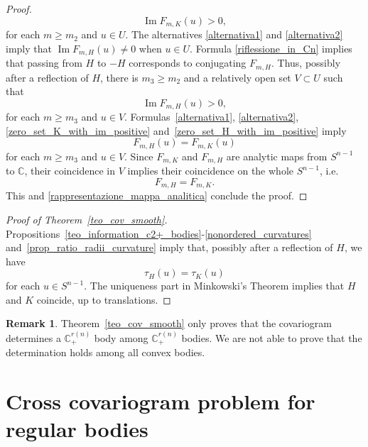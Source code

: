 \documentclass[a4paper]{amsart}
\theoremstyle{definition}
\newtheorem{remark}[theorem]{Remark}
\numberwithin{equation}{section}
\begin{document}
\begin{proof}
\begin{equation}\label{zero_set_K_with_im_positive}
{\operatorname{Im}} F_{m,K}(u)>0,
\end{equation}
for each $m\ge m_2$ and $u\in U$. The alternatives  \eqref{alternativa1} and \eqref{alternativa2} imply that ${\operatorname{Im}} F_{m,H}(u)\neq0$ when $u\in U$.
Formula \eqref{riflessione_in_Cn} implies that passing from $H$ to $-H$ corresponds to conjugating $F_{m,H}$.  Thus, possibly after a reflection of $H$, there is $m_3\geq m_2$ and  a relatively open set $V\subset U$ such that
\begin{equation}\label{zero_set_H_with_im_positive}
{\operatorname{Im}} F_{m,H}(u)>0,
\end{equation}
for each $m\geq m_3$ and $u\in V$. Formulas~\eqref{alternativa1}, \eqref{alternativa2}, \eqref{zero_set_K_with_im_positive} and~\eqref{zero_set_H_with_im_positive}  imply
\begin{equation*}
 F_{m,H}(u)=F_{m,K}(u)
\end{equation*}
for each $m\geq m_3$ and $u\in V$. Since $F_{m,K}$ and $F_{m,H}$ are analytic maps from ${S^{n-1}}$ to ${\mathbb{C}}$, their coincidence in $V$ implies their coincidence on the whole ${S^{n-1}}$, i.e.
\[
 F_{m,H}=F_{m,K}.
\]
This and  \eqref{rappresentazione_mappa_analitica} conclude the proof.
\end{proof}

\begin{proof}[Proof of Theorem~\ref{teo_cov_smooth}]
 Propositions~\ref{teo_information_c2+_bodies}-\eqref{nonordered_curvatures} and~\eqref{prop_ratio_radii_curvature} imply that, possibly after a reflection of $H$, we have
\[
{\tau}_H(u)={\tau}_K(u)
\]
for each $u\in{S^{n-1}}$. The uniqueness part in Minkowski's Theorem \cite[Th. 7.2.1]{Sc} implies that $H$ and $K$ coincide, up to translations.
\end{proof}
\begin{remark}
Theorem~\ref{teo_cov_smooth} only proves that the covariogram determines a ${\mathbb{C}}^{{r(n)}}_+$ body among ${\mathbb{C}}^{{r(n)}}_+$ bodies. We are not able to prove that the determination holds among  all convex bodies.
\end{remark}

\section{Cross covariogram problem for regular bodies}\label{sec_cross_cov}
\smallskip
\end{document}
